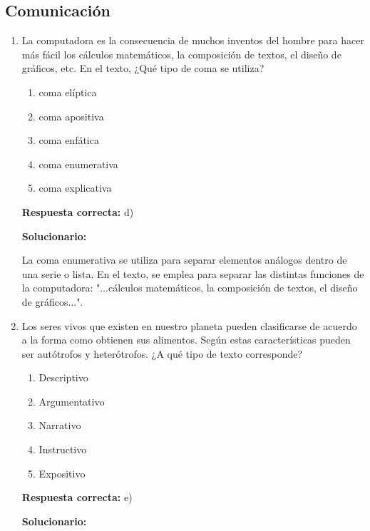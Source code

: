 \subsection*{Comunicación}

\begin{enumerate}[resume]
	
\item La computadora es la consecuencia de muchos inventos del hombre para hacer más fácil los cálculos matemáticos, la composición de textos, el diseño de gráficos, etc.
En el texto, ¿Qué tipo de coma se utiliza?

\begin{enumerate}[label=\alph*)]
	\item coma elíptica
	\item coma apositiva
	\item coma enfática
	\item coma enumerativa
	\item coma explicativa
\end{enumerate}

\textbf{Respuesta correcta:} d)

\vspace{2mm}
\textbf{Solucionario:}

La coma enumerativa se utiliza para separar elementos análogos dentro de una serie o lista. En el texto, se emplea para separar las distintas funciones de la computadora: "...cálculos matemáticos, la composición de textos, el diseño de gráficos...".

\vspace{6mm}

\item Los seres vivos que existen en nuestro planeta pueden clasificarse de acuerdo a la forma como obtienen sus alimentos. Según estas características pueden ser autótrofos y heterótrofos.
¿A qué tipo de texto corresponde?

\begin{enumerate}[label=\alph*)]
	\item Descriptivo
	\item Argumentativo
	\item Narrativo
	\item Instructivo
	\item Expositivo
\end{enumerate}

\textbf{Respuesta correcta:} e)

\vspace{2mm}
\textbf{Solucionario:}


\end{enumerate}
